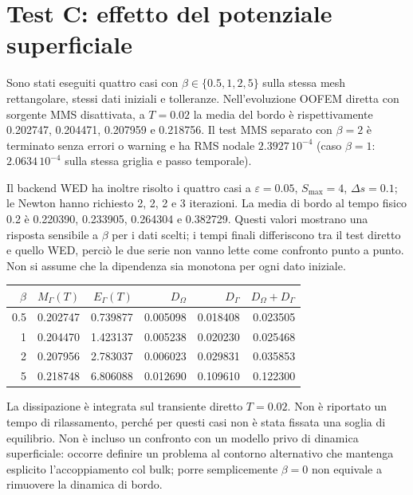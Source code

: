 \documentclass[10pt,a4paper]{article}
\begin{document}
\section{Test C: effetto del potenziale superficiale}
Sono stati eseguiti quattro casi con $\beta\in\{0.5,1,2,5\}$ sulla stessa mesh rettangolare, stessi dati iniziali e tolleranze. Nell'evoluzione OOFEM diretta con sorgente MMS disattivata, a $T=0.02$ la media del bordo è rispettivamente 0.202747, 0.204471, 0.207959 e 0.218756. Il test MMS separato con $\beta=2$ è terminato senza errori o warning e ha RMS nodale $2.3927\,10^{-4}$ (caso $\beta=1$: $2.0634\,10^{-4}$ sulla stessa griglia e passo temporale).

Il backend WED ha inoltre risolto i quattro casi a $\varepsilon=0.05$, $S_{\max}=4$, $\Delta s=0.1$; le Newton hanno richiesto 2, 2, 2 e 3 iterazioni. La media di bordo al tempo fisico 0.2 è 0.220390, 0.233905, 0.264304 e 0.382729. Questi valori mostrano una risposta sensibile a $\beta$ per i dati scelti; i tempi finali differiscono tra il test diretto e quello WED, perciò le due serie non vanno lette come confronto punto a punto. Non si assume che la dipendenza sia monotona per ogni dato iniziale.

\begin{center}\small
\begin{tabular}{rrrrrr}
\toprule
$\beta$ & $M_\Gamma(T)$ & $E_\Gamma(T)$ & $D_\Omega$ & $D_\Gamma$ & $D_\Omega+D_\Gamma$\\
\midrule
0.5 & 0.202747 & 0.739877 & 0.005098 & 0.018408 & 0.023505\\
1 & 0.204470 & 1.423137 & 0.005238 & 0.020230 & 0.025468\\
2 & 0.207956 & 2.783037 & 0.006023 & 0.029831 & 0.035853\\
5 & 0.218748 & 6.806088 & 0.012690 & 0.109610 & 0.122300\\
\bottomrule
\end{tabular}
\end{center}
La dissipazione è integrata sul transiente diretto $T=0.02$. Non è riportato un tempo di rilassamento, perché per questi casi non è stata fissata una soglia di equilibrio.
Non è incluso un confronto con un modello privo di dinamica superficiale: occorre definire un problema al contorno alternativo che mantenga esplicito l'accoppiamento col bulk; porre semplicemente $\beta=0$ non equivale a rimuovere la dinamica di bordo.
\end{document}
